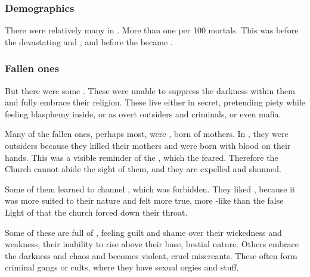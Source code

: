 




\subsubsection{Demographics}
There were relatively many \resphain{} in \Merkyrah. 
More than one per 100 mortals. 
This was before the devastating \secondbanewar{} and \resphanwars, and before the  became . 





\subsubsection{Fallen ones}
But there were some  \resphain. 
These were unable to suppress the darkness within them and fully embrace their religion. 
These live either in secret, pretending piety while feeling blasphemy inside, or as overt outsiders and criminals, or even mafia. 

Many of the fallen ones, perhaps most, were , born of \human{} mothers. 
In \Merkyrah, they were outsiders because they killed their mothers and were born with blood on their hands. 
This was a visible reminder of the \resphan{} , which the \Merkyrans{} feared. 
Therefore the Church cannot abide the sight of them, and they are expelled and shunned. 

Some of them learned to channel , which was forbidden. 
They liked \nieur, because it was more suited to their nature and felt more true, more \resphan-like than the false Light of  that the church forced down their throat.

Some of these are full of , feeling guilt and shame over their wickedness and weakness, their inability to rise above their base, bestial nature. 
Others embrace the darkness and chaos and becomes violent, cruel miscreants. 
These often form criminal gangs or cults, where they have sexual orgies and stuff. 

